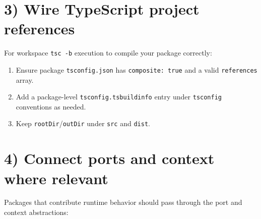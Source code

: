 \section{3) Wire TypeScript project references}\label{record-011-wire-typescript-project-references}

For workspace \texttt{t\allowbreak{}s\allowbreak{}c\allowbreak{} \allowbreak{}-\allowbreak{}b} execution to compile your package correctly:

\begin{enumerate}
\def\labelenumi{\arabic{enumi}.}
\tightlist
\item
  Ensure package \texttt{t\allowbreak{}s\allowbreak{}c\allowbreak{}o\allowbreak{}n\allowbreak{}f\allowbreak{}i\allowbreak{}g\allowbreak{}.\allowbreak{}j\allowbreak{}s\allowbreak{}o\allowbreak{}n} has \texttt{c\allowbreak{}o\allowbreak{}m\allowbreak{}p\allowbreak{}o\allowbreak{}s\allowbreak{}i\allowbreak{}t\allowbreak{}e\allowbreak{}:\allowbreak{} \allowbreak{}t\allowbreak{}r\allowbreak{}u\allowbreak{}e} and a valid \texttt{r\allowbreak{}e\allowbreak{}f\allowbreak{}e\allowbreak{}r\allowbreak{}e\allowbreak{}n\allowbreak{}c\allowbreak{}e\allowbreak{}s} array.
\item
  Add a package-level \texttt{t\allowbreak{}s\allowbreak{}c\allowbreak{}o\allowbreak{}n\allowbreak{}f\allowbreak{}i\allowbreak{}g\allowbreak{}.\allowbreak{}t\allowbreak{}s\allowbreak{}b\allowbreak{}u\allowbreak{}i\allowbreak{}l\allowbreak{}d\allowbreak{}i\allowbreak{}n\allowbreak{}f\allowbreak{}o} entry under \texttt{t\allowbreak{}s\allowbreak{}c\allowbreak{}o\allowbreak{}n\allowbreak{}f\allowbreak{}i\allowbreak{}g} conventions as needed.
\item
  Keep \texttt{r\allowbreak{}o\allowbreak{}o\allowbreak{}t\allowbreak{}D\allowbreak{}i\allowbreak{}r}/\texttt{o\allowbreak{}u\allowbreak{}t\allowbreak{}D\allowbreak{}i\allowbreak{}r} under \texttt{s\allowbreak{}r\allowbreak{}c} and \texttt{d\allowbreak{}i\allowbreak{}s\allowbreak{}t}.
\end{enumerate}

\section{4) Connect ports and context where relevant}\label{record-011-connect-ports-and-context-where-relevant}

Packages that contribute runtime behavior should pass through the port and context abstractions:

